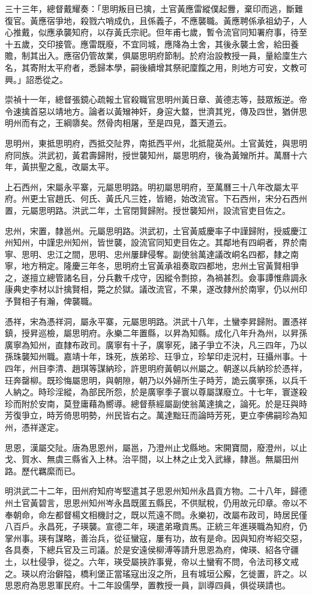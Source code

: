\begin{pinyinscope}
三十三年，總督戴耀奏：「思明叛目已擒，土官黃應雷縱僕起釁，棄印而逃，斷難復官。黃應宿爭地，殺戮六哨成仇，且係義子，不應襲職。黃應聘係承祖幼子，人心推戴，似應承襲知府，以存黃氏宗祀。但年甫七歲，暫令流官同知署府事，待至十五歲，交印接管。應雷既廢，不宜同城，應降為土舍，其後永襲土舍，給田養贍，制其出入。應宿仍管故業，俱屬思明府節制。於府治設教授一員，量給廩生六名，其寄附太平府者，悉歸本學，嗣後續增其祭祀廩餼之用，則地方可安，文教可興。」詔悉從之。

崇禎十一年，總督張鏡心疏報土官殺職官思明州黃日章、黃德志等，鼓眾叛逆。帝令速擒首惡以靖地方。論者以黃矰神奸，身逭大盩，世濟其兇，傳及四世，猶併思明州而有之，王綱隳矣。然骨肉相屠，至是四見，蓋天道云。

思明州，東抵思明府，西抵交阯界，南抵西平州，北抵龍英州。土官黃姓，與思明府同族。洪武初，黃君壽歸附，授世襲知州，屬思明府，後為黃矰所并。萬曆十六年，黃拱聖之亂，改屬太平。

上石西州，宋屬永平寨，元屬思明路。明初屬思明府，至萬曆三十八年改屬太平府。州更土官趙氏、何氏、黃氏凡三姓，皆絕，始改流官。下石西州，宋分石西州置，元屬思明路。洪武二年，土官閉賢歸附。授世襲知州，設流官吏目佐之。

忠州，宋置，隸邕州。元屬思明路。洪武初，土官黃威慶率子中謹歸附，授威慶江州知州，中謹忠州知州，皆世襲，設流官同知吏目佐之。其鄰地有四峒者，界於南寧、思明、忠江之間，思明、忠州屢肆侵奪。副使翁萬達議改峒名四都，隸之南寧，地方稍定。隆慶三年冬，思明府土官黃承祖奏取四都地，忠州土官黃賢相爭之，遂擅立總管諸名目，分兵數千戍守，因縱令剽掠，為禍甚烈。僉事譚惟鼎調永康典史李材以計擒賢相，斃之於獄。議改流官，不果，遂改隸州於南寧，仍以州印予賢相子有瀚，俾襲職。

憑祥，宋為憑祥洞，屬永平寨，元屬思明路。洪武十八年，土蠻李昇歸附。置憑祥鎮，授昇巡檢，屬思明府。永樂二年置縣，以昇為知縣。成化八年升為州，以昇孫廣寧為知州，直隸布政司。廣寧有十子，廣寧死，諸子爭立不決，凡三四年，乃以孫珠襲知州職。嘉靖十年，珠死，族弟珍、玨爭立，珍挈印走況村，玨攝州事。十四年，州目李清、趙琪等謀納珍，許思明府黃朝以州屬之。朝遂以兵納珍於憑祥，玨奔罄柳。既珍悔屬思明，與朝隙，朝乃以外婦所生子時芳，詭云廣寧孫，以兵千人納之。時珍淫縱，為部民所怨，於是廣寧季子寰以尊屬謀廢立。十七年，寰遂殺珍而附於安南，莫登庸藉為嚮導。總督蔡經屬副使翁萬達擒之，論死。於是玨與時芳復爭立，時芳倚思明勢，州民皆右之。萬達黜玨而論時芳死，更立李佛嗣珍為知州，憑祥遂定。

思恩，漢屬交阯。唐為思恩州，屬邕，乃澄州止戈縣地。宋開寶間，廢澄州，以止戈、賀水、無虞三縣省入上林。治平間，以上林之止戈入武緣，隸邕。無屬田州路。歷代羈縻而已。

明洪武二十二年，田州府知府岑堅遣其子思恩州知州永昌貢方物。二十八年，歸德州土官黃碧言，思恩州知州岑永昌既匿五縣民，不供賦稅，仍用故元印章。帝以不奉朝命，命左都督楊文相機討之，既以荒遠不問。永樂初，改屬布政司，時居民僅八百戶。永昌死，子瑛襲。宣德二年，瑛遣弟璥貢馬。正統三年進瑛職為知府，仍掌州事。瑛有謀略，善治兵，從征蠻寇，屢有功，故有是命。因與知府岑紹交惡，各具奏，下總兵官及三司議。於是安遠侯柳溥等請升思恩為府，俾瑛、紹各守疆土，以杜侵爭，從之。六年，瑛受屬挾詐事覺，帝以土蠻宥不問，令法司移文戒之。瑛以府治僻隘，橋利堡正當瑤寇出沒之所，且有城垣公廨，乞徙置，許之。以思恩府為思恩軍民府。十二年設儒學，置教授一員，訓導四員，俱從瑛請也。


\end{pinyinscope}
